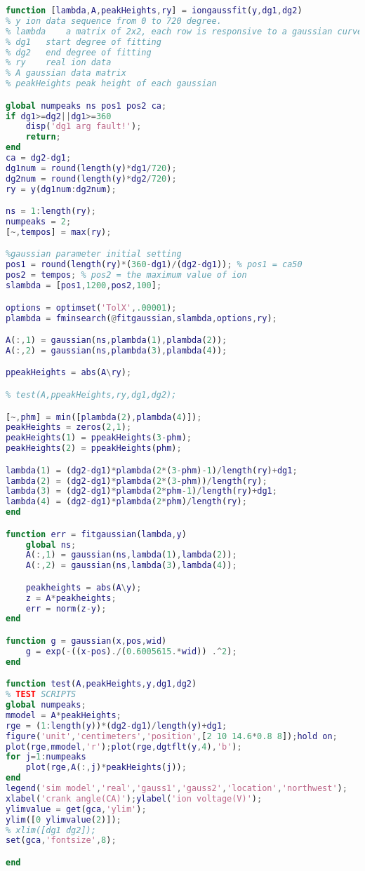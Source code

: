 \begin{lstlisting}[frame=single,language=matlab]
function [lambda,A,peakHeights,ry] = iongaussfit(y,dg1,dg2)
% y	ion data sequence from 0 to 720 degree.
% lambda	a matrix of 2x2, each row is responsive to a gaussian curve
% dg1	start degree of fitting
% dg2	end degree of fitting
% ry	real ion data
% A	gaussian data matrix
% peakHeights peak height of each gaussian

global numpeaks ns pos1 pos2 ca;
if dg1>=dg2||dg1>=360
    disp('dg1 arg fault!');
    return;
end
ca = dg2-dg1;
dg1num = round(length(y)*dg1/720);
dg2num = round(length(y)*dg2/720);
ry = y(dg1num:dg2num);

ns = 1:length(ry);
numpeaks = 2;
[~,tempos] = max(ry);

%gaussian parameter initial setting
pos1 = round(length(ry)*(360-dg1)/(dg2-dg1)); % pos1 = ca50
pos2 = tempos; % pos2 = the maximum value of ion
slambda = [pos1,1200,pos2,100];

options = optimset('TolX',.00001);
plambda = fminsearch(@fitgaussian,slambda,options,ry);

A(:,1) = gaussian(ns,plambda(1),plambda(2));
A(:,2) = gaussian(ns,plambda(3),plambda(4));

ppeakHeights = abs(A\ry);

% test(A,ppeakHeights,ry,dg1,dg2);

[~,phm] = min([plambda(2),plambda(4)]);
peakHeights = zeros(2,1);
peakHeights(1) = ppeakHeights(3-phm);
peakHeights(2) = ppeakHeights(phm);

lambda(1) = (dg2-dg1)*plambda(2*(3-phm)-1)/length(ry)+dg1;
lambda(2) = (dg2-dg1)*plambda(2*(3-phm))/length(ry);
lambda(3) = (dg2-dg1)*plambda(2*phm-1)/length(ry)+dg1;
lambda(4) = (dg2-dg1)*plambda(2*phm)/length(ry);
end

function err = fitgaussian(lambda,y)
    global ns;
    A(:,1) = gaussian(ns,lambda(1),lambda(2));
    A(:,2) = gaussian(ns,lambda(3),lambda(4));

    peakheights = abs(A\y);
    z = A*peakheights;
    err = norm(z-y);
end

function g = gaussian(x,pos,wid)
    g = exp(-((x-pos)./(0.6005615.*wid)) .^2);
end

function test(A,peakHeights,y,dg1,dg2)
% TEST SCRIPTS
global numpeaks;
mmodel = A*peakHeights;
rge = (1:length(y))*(dg2-dg1)/length(y)+dg1;
figure('unit','centimeters','position',[2 10 14.6*0.8 8]);hold on;
plot(rge,mmodel,'r');plot(rge,dgtflt(y,4),'b');
for j=1:numpeaks
    plot(rge,A(:,j)*peakHeights(j));
end
legend('sim model','real','gauss1','gauss2','location','northwest');
xlabel('crank angle(CA)');ylabel('ion voltage(V)');
ylimvalue = get(gca,'ylim');
ylim([0 ylimvalue(2)]);
% xlim([dg1 dg2]);
set(gca,'fontsize',8);

end
\end{lstlisting}